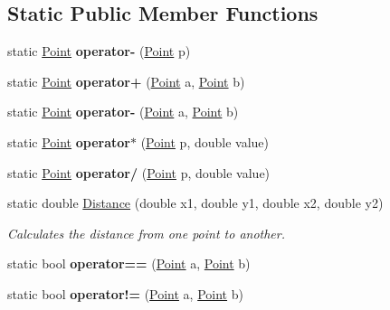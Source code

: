 \subsection*{Static Public Member Functions}
\begin{DoxyCompactItemize}
\item 
\mbox{\label{struct_s_g_l_1_1_point_a1f03b9dc317808ffceac4a8b65443d10}} 
static \mbox{\hyperlink{struct_s_g_l_1_1_point}{Point}} {\bfseries operator-\/} (\mbox{\hyperlink{struct_s_g_l_1_1_point}{Point}} p)
\item 
\mbox{\label{struct_s_g_l_1_1_point_a27314b0efd592b31cef2f58b3d17e74e}} 
static \mbox{\hyperlink{struct_s_g_l_1_1_point}{Point}} {\bfseries operator+} (\mbox{\hyperlink{struct_s_g_l_1_1_point}{Point}} a, \mbox{\hyperlink{struct_s_g_l_1_1_point}{Point}} b)
\item 
\mbox{\label{struct_s_g_l_1_1_point_a3a06ac359ac9d1af2aefef9874ef6d3b}} 
static \mbox{\hyperlink{struct_s_g_l_1_1_point}{Point}} {\bfseries operator-\/} (\mbox{\hyperlink{struct_s_g_l_1_1_point}{Point}} a, \mbox{\hyperlink{struct_s_g_l_1_1_point}{Point}} b)
\item 
\mbox{\label{struct_s_g_l_1_1_point_ad326976c9346f26566388898f9049ac6}} 
static \mbox{\hyperlink{struct_s_g_l_1_1_point}{Point}} {\bfseries operator$\ast$} (\mbox{\hyperlink{struct_s_g_l_1_1_point}{Point}} p, double value)
\item 
\mbox{\label{struct_s_g_l_1_1_point_a6d529ac9b58ac7fef196be302b8d5ac0}} 
static \mbox{\hyperlink{struct_s_g_l_1_1_point}{Point}} {\bfseries operator/} (\mbox{\hyperlink{struct_s_g_l_1_1_point}{Point}} p, double value)
\item 
static double \mbox{\hyperlink{struct_s_g_l_1_1_point_a88dc45979fe8192615705469fc12f18b}{Distance}} (double x1, double y1, double x2, double y2)
\begin{DoxyCompactList}\small\item\em Calculates the distance from one point to another. \end{DoxyCompactList}\item 
\mbox{\label{struct_s_g_l_1_1_point_a1df0fcbce5751738c6e2ce49bb5e3348}} 
static bool {\bfseries operator==} (\mbox{\hyperlink{struct_s_g_l_1_1_point}{Point}} a, \mbox{\hyperlink{struct_s_g_l_1_1_point}{Point}} b)
\item 
\mbox{\label{struct_s_g_l_1_1_point_a3dd8c199fe7f90ba9ae0b1db6ea49a48}} 
static bool {\bfseries operator!=} (\mbox{\hyperlink{struct_s_g_l_1_1_point}{Point}} a, \mbox{\hyperlink{struct_s_g_l_1_1_point}{Point}} b)
\end{DoxyCompactItemize}
